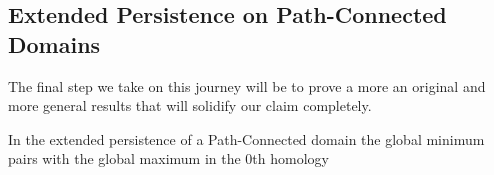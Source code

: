 


\subsection{Extended Persistence on Path-Connected Domains}

The final step we take on this journey will be to prove a more an original and more general results that will solidify our claim completely.

\begin{prop} In the extended persistence of a Path-Connected domain the global minimum pairs with the global maximum in the 0th homology \end{prop}

